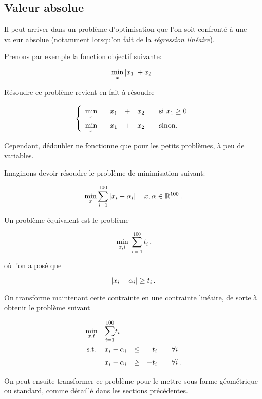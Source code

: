 \subsection{Valeur absolue}

	Il peut arriver dans un problème d'optimisation
	que l'on soit confronté à une valeur absolue
	(notamment lorsqu'on fait de la \emph{régression linéaire}).

	Prenons par exemple la fonction objectif suivante:

	\[
	\min_x \left\lvert x_1\right\lvert + x_2\,.
	\]

	Résoudre ce problème revient en fait à résoudre

	\[
	\left\{
	\renewcommand{\arraystretch}{1.5}
	\begin{array}{c@{\quad} r c r@{\qquad} l}
		\min\limits_x & x_1 & + & x_2 & \textnormal{si } x_1 \ge 0\\
		\min\limits_x & -x_1 & + & x_2 & \textnormal{sinon.}
	\end{array}
	\right.
	\]

	Cependant, dédoubler ne fonctionne que pour les petits problèmes,
	à peu de variables.

	Imaginons devoir résoudre le problème de minimisation suivant:

	\[
	\min_x \sum_{i=1}^{100} \left\lvert x_i - \alpha_i\right\lvert \quad x,\alpha \in \mathbb{R}^{100}\,.
	\]

	Un problème équivalent est le problème

	\[
	\min_{x,t} \sum_{i=1}^{100} t_i\,,
	\]

	où l'on a posé que

	\[
	\left\lvert x_i - \alpha_i\right\lvert \ge t_i\,.
	\]

	On transforme maintenant cette contrainte en une contrainte linéaire,
	de sorte à obtenir le problème suivant

	\[
	\renewcommand{\arraystretch}{1.5}
	\begin{array}{c@{\quad} l c r@{\qquad} l}
		\min\limits_{x,t} & {\displaystyle \sum_{i=1}^{100}} t_i &&&\\
		\textnormal{s.t.} & x_i - \alpha_i & \le & t_i & \forall i\\
		& x_i - \alpha_i & \ge & -t_i & \forall i\,.\\
	\end{array}
	\]

	On peut ensuite transformer ce problème
	pour le mettre sous forme géométrique ou standard,
	comme détaillé dans les sections précédentes.

